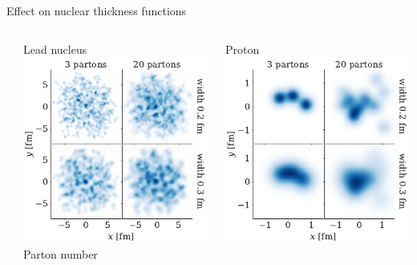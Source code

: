 \documentclass[aspectratio=43]{beamer}
\theoremstyle{definition}
\begin{document}
\begin{frame}{Effect on nuclear thickness functions}
  \begin{columns}
    \begin{column}{.02\textwidth}
    \end{column}
    \begin{column}{.49\textwidth}
      \centering Lead nucleus \\ 
      \includegraphics[height=\columnwidth]{Pb_thickness} \\
      \small Parton number
    \end{column}
    \begin{column}{.49\textwidth}
      \centering Proton \\
      \includegraphics[height=\columnwidth]{p_thickness} \\

\end{column}
\end{columns}
\end{frame}
\end{document}
